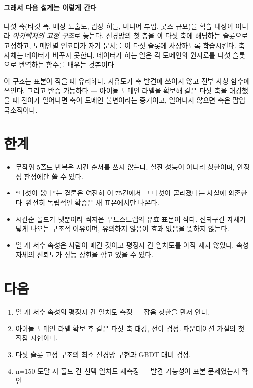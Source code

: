 \documentclass[10pt]{article}
\begin{document}
\paragraph{그래서 다음 설계는 이렇게 간다}
다섯 축(타깃 폭, 매장 노출도, 입장 허들, 미디어 투입, 굿즈 규모)을 학습 대상이 아니라
\emph{아키텍처의 고정 구조}로 놓는다. 신경망의 첫 층을 이 다섯 축에 해당하는 슬롯으로
고정하고, 도메인별 인코더가 자기 문서를 이 다섯 슬롯에 사상하도록 학습시킨다. 축
자체는 데이터가 바꾸지 못한다. 데이터가 하는 일은 각 도메인의 원자료를 다섯 슬롯으로
번역하는 함수를 배우는 것뿐이다.

이 구조는 표본이 작을 때 유리하다. 자유도가 축 발견에 쓰이지 않고 전부 사상 함수에
쓰인다. 그리고 반증 가능하다 --- 아이돌 도메인 라벨을 확보해 같은 다섯 축을 태깅했을 때
전이가 일어나면 축이 도메인 불변이라는 증거이고, 일어나지 않으면 축은 팝업 국소적이다.

\section{한계}

\begin{itemize}[leftmargin=1.1em,itemsep=0.15em]
\item 무작위 5폴드 반복은 시간 순서를 쓰지 않는다. 실전 성능이 아니라 상한이며,
      안정성 판정에만 쓸 수 있다.
\item ``다섯이 옳다''는 결론은 여전히 이 75건에서 그 다섯이 골라졌다는 사실에
      의존한다. 완전히 독립적인 확증은 새 표본에서만 나온다.
\item 시간순 폴드가 넷뿐이라 짝지은 부트스트랩의 유효 표본이 작다. 신뢰구간 자체가
      넓게 나오는 구조적 이유이며, 유의하지 않음이 효과 없음을 뜻하지 않는다.
\item 열 개 서수 속성은 사람이 매긴 것이고 평정자 간 일치도를 아직 재지 않았다.
      속성 자체의 신뢰도가 성능 상한을 깎고 있을 수 있다.
\end{itemize}

\section{다음}

\begin{enumerate}[leftmargin=1.3em,itemsep=0.15em]
\item 열 개 서수 속성의 평정자 간 일치도 측정 --- 잡음 상한을 먼저 안다.
\item 아이돌 도메인 라벨 확보 후 같은 다섯 축 태깅, 전이 검정. 파운데이션 가설의
      첫 직접 시험이다.
\item 다섯 슬롯 고정 구조의 최소 신경망 구현과 GBDT 대비 검정.
\item n=150 도달 시 폴드 간 선택 일치도 재측정 --- 발견 가능성이 표본 문제였는지 확인.
\end{enumerate}
\end{document}
